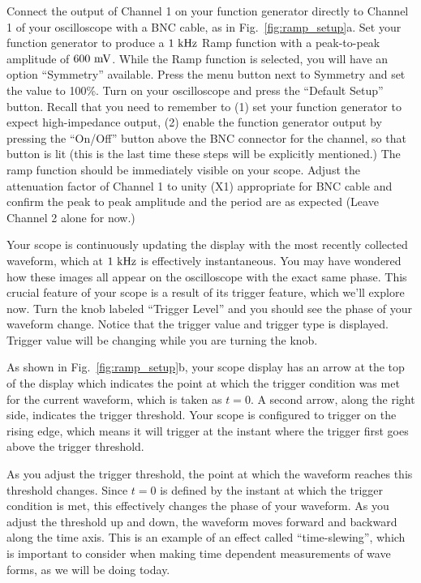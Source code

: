 Connect the output of Channel 1 on your function generator directly to
Channel 1 of your oscilloscope with a BNC cable, as in
Fig.~\ref{fig:ramp_setup}a.  Set your function generator to produce a
$1~\rm kHz$ Ramp function with a peak-to-peak amplitude of $600~\rm
mV$. While the Ramp function is selected, you will have an option
``Symmetry'' available.  Press the menu button next to Symmetry and
set the value to 100\%.  Turn on your oscilloscope and press the
``Default Setup'' button.  Recall that you need to
remember to (1) set your function generator to expect high-impedance
output, (2) enable the function generator output by pressing the
``On/Off'' button above the BNC connector for the channel, so that
button is lit (this is the last time these steps will be explicitly
mentioned.)  The ramp function should be immediately visible on your
scope.  Adjust the attenuation factor of Channel 1 to unity (X1)
appropriate for BNC cable and confirm the peak to peak amplitude and
the period are as expected (Leave Channel 2 alone for now.)

Your scope is continuously updating the display with the most recently
collected waveform, which at $1~\rm kHz$ is effectively instantaneous.
You may have wondered how these images all appear on the oscilloscope
with the exact same phase.  This crucial feature of your scope is a
result of its trigger feature, which we'll explore now.  Turn the knob
labeled ``Trigger Level'' and you should see the phase of your
waveform change. Notice that the trigger value and trigger type 
is displayed. Trigger value will be changing while you are turning the knob. 

As shown in Fig.~\ref{fig:ramp_setup}b, your scope display has an arrow at
the top of the display which indicates the point at which the trigger
condition was met for the current waveform, which is taken as $t=0$.
A second arrow, along the right side, indicates the trigger threshold.
Your scope is configured to trigger on the rising edge, which means it
will trigger at the instant where the trigger first goes above the
trigger threshold.

As you adjust the trigger threshold, the point at which the waveform
reaches this threshold changes.  Since $t=0$ is defined by the instant
at which the trigger condition is met, this effectively changes the
phase of your waveform.  As you adjust the threshold up and down, the
waveform moves forward and backward along the time axis.  This is an
example of an effect called ``time-slewing'', which is important to
consider when making time dependent measurements of wave forms, as we
will be doing today.

